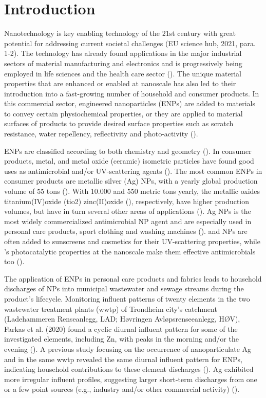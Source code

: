 \chapter{Introduction}
Nanotechnology is key enabling technology of the 21st century with great potential for addressing current societal challenges (EU science hub, 2021, para. 1-2). The technology has already found applications in the major industrial sectors of material manufacturing and electronics and is progressively being employed in life sciences and the health care sector (\cite{Talebian2021}). The unique material properties that are enhanced or enabled at nanoscale has also led to their introduction into a fast-growing number of household and consumer products. In this commercial sector, engineered nanoparticles (ENPs) are added to materials to convey certain physiochemical properties, or they are applied to material surfaces of products to provide desired surface properties such as scratch resistance, water repellency, reflectivity and photo-activity (\cite{Bodarenko2013, Weir2012}).

\acrshort{ENPs} are classified according to both chemistry and geometry (\cite{Warheit2018}). In consumer products, metal, and metal oxide (ceramic) isometric particles have found good uses as antimicrobial and/or UV-scattering agents (\cite{Bodarenko2013}). The most common \acrshort{ENPs} in consumer products are metallic silver (\acrshort{Ag}) NPs, with a yearly global production volume of 55 tons (\cite{Piccinno2012}). With 10.000 and 550 metric tons yearly, the metallic oxides titanium(IV)oxide (\acrshort{tio2}) zinc(II)oxide (), respectively, have higher production volumes, but have in turn several other areas of applications (\cite{Piccinno2012, Bodarenko2013}). \acrshort{Ag} NPs is the most widely commercialized antimicrobial NP agent and are especially used in personal care products, sport clothing and washing machines (\cite{Bodarenko2013, Farkas2011}).  and  NPs are often added to sunscreens and cosmetics for their UV-scattering properties, while {}'s photocatalytic properties at the nanoscale make them effective antimicrobials too (\cite{Bodarenko2013, Weir2012}).

The application of \acrshort{ENPs} in personal care products and fabrics leads to household discharges of NPs into municipal wastewater and sewage streams during the product’s lifecycle. Monitoring influent patterns of twenty elements in the two wastewater treatment plants (\acrshort{wwtp}) of Trondheim city’s catchment (Ladehammeren Renseanlegg, LAD; Høvringen Avløpsrenseeanlegg, HØV),  Farkas et al. (2020) found a cyclic diurnal influent pattern for some of the investigated elements, including Zn, with peaks in the morning and/or the evening (\cite{Farkas2020}). A previous study focusing on the occurrence of nanoparticulate \acrshort{Ag} and  in the same \acrshort{wwtp} revealed the same diurnal influent pattern for  \acrshort{ENPs}, indicating household contributions to these element discharges (\cite{Polesel2018}). \acrshort{Ag} exhibited more irregular influent profiles, suggesting larger short-term discharges from one or a few point sources (e.g., industry and/or other commercial activity) (\cite{Polesel2018}). 

